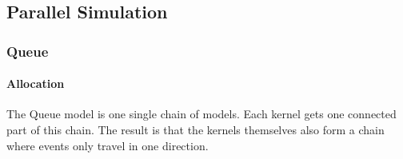

\subsection{Parallel Simulation}

\subsubsection{Queue}
\paragraph*{Allocation}
The Queue model is one single chain of models. Each kernel gets one connected part of this chain. The result is that the kernels themselves also form a chain where events only travel in one direction.

